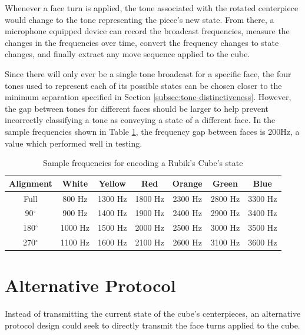 Whenever a face turn is applied, the tone associated with the rotated centerpiece would change to the tone representing the piece's new state.
From there, a microphone equipped device can record the broadcast frequencies, measure the changes in the frequencies over time, convert the frequency changes to state changes, and finally extract any move sequence applied to the cube.

Since there will only ever be a single tone broadcast for a specific face, the four tones used to represent each of its possible states can be chosen closer to the minimum separation specified in Section \ref{subsec:tone-distinctiveness}. 
However, the gap between tones for different faces should be larger to help prevent incorrectly classifying a tone as conveying a state of a different face. 
In the sample frequencies shown in Table \ref{table:centerpiece-frequencies}, the frequency gap between faces is 200Hz, a value which performed well in testing.

\begin{table}[h]
    \centering
    \caption{Sample frequencies for encoding a Rubik's Cube's state}
    \label{table:centerpiece-frequencies}
    \begin{tabular}{ | c | c | c | c | c | c | c | }
        \hline
        Alignment & White & Yellow & Red & Orange & Green & Blue\\
        \hline
        \hline
        Full & 800 Hz & 1300 Hz & 1800 Hz & 2300 Hz & 2800 Hz & 3300 Hz\\
        90$^\circ$ & 900 Hz & 1400 Hz & 1900 Hz & 2400 Hz & 2900 Hz & 3400 Hz\\
        180$^\circ$ & 1000 Hz & 1500 Hz & 2000 Hz & 2500 Hz & 3000 Hz & 3500 Hz\\
        270$^\circ$ & 1100 Hz & 1600 Hz & 2100 Hz & 2600 Hz & 3100 Hz & 3600 Hz\\
        \hline
    \end{tabular}
\end{table}


\section{Alternative Protocol}
\label{sec:alternatives}
Instead of transmitting the current state of the cube's centerpieces, an alternative protocol design could seek to directly transmit the face turns applied to the cube.

